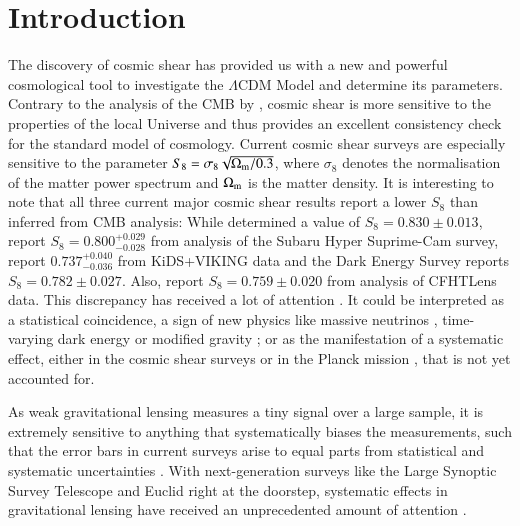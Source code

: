 
\section{Introduction}
The discovery of cosmic shear has provided us with a new and powerful cosmological tool to investigate the $\Lambda$CDM Model and determine its parameters. Contrary to the analysis of the CMB by \citet{2018arXiv180706209P}, cosmic shear is more sensitive to the properties of the local Universe and thus provides an excellent consistency check for the standard model of cosmology. Current cosmic shear surveys are especially sensitive to the parameter $S_8=\sigma_8 \sqrt{\Omega_{\rm m}/0.3}$, where $\sigma_8$ denotes the normalisation of the matter power spectrum and $\Omega_{\rm m}$ is the matter density.
It is interesting to note that all three current major cosmic shear results report a lower $S_8$ than inferred from CMB analysis: While \citet{2018arXiv180706209P} determined a value of $S_8 = 0.830 \pm 0.013$, 
\citet{2018arXiv180909148H} report $S_8 = 0.800^{+0.029}_{-0.028}$ from analysis of the Subaru Hyper Suprime-Cam survey, \citet{2018arXiv181206076H} report $0.737_{-0.036}^{+0.040}$ from KiDS+VIKING data and the Dark Energy Survey \citep{2018PhRvD..98d3528T} reports $S_8=0.782\pm 0.027$. Also, \citet{2013MNRAS.432.2433H} report $S_8 = 0.759 \pm 0.020$ from analysis of CFHTLens data. This discrepancy has received a lot of attention \citep{2013PDU.....2..166V}. It could be interpreted as a statistical coincidence, a sign of new physics like massive neutrinos \citep{2014PhRvL.112e1303B}, time-varying dark energy or modified gravity \citep{2016A&A...594A..14P}; or as the manifestation of a systematic effect, either in the cosmic shear surveys or in the Planck mission \citep{2016ApJ...818..132A}, that is not yet accounted for. 

As weak gravitational lensing measures a tiny signal over a large sample, it is extremely sensitive to anything that systematically biases the measurements, such that the error bars in current surveys arise to equal parts from statistical and systematic uncertainties \citep[compare][]{2017MNRAS.465.1454H}. With next-generation surveys like the Large Synoptic Survey Telescope and Euclid right at the doorstep, systematic effects in gravitational lensing have received an unprecedented amount of attention \citep{2018arXiv181002353A,2019arXiv190207439B,2019arXiv190109488S}. %

